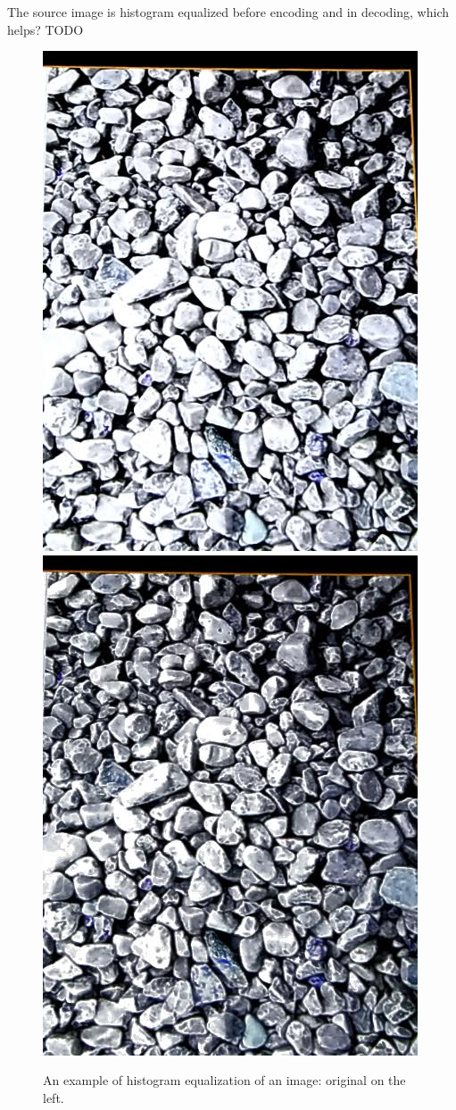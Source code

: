 \documentclass[11pt, letterpaper]{article}
\begin{document}
The source image is histogram equalized before encoding and in decoding, which helps? TODO
\begin{figure}[hbtp]
\centering
\includegraphics[scale=0.2]{img/histeq1.jpg}
\includegraphics[scale=0.2]{img/histeq2.jpg}
\caption{An example of histogram equalization of an image: original on the left.}
\label{fig:histogram}
\end{figure}
\end{document}
